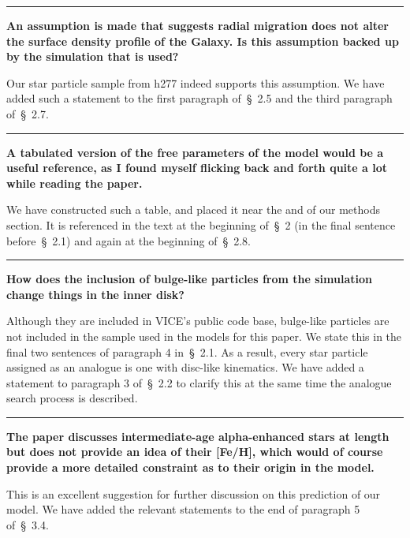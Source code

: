 \documentclass{report}
\newcommand{\breakline}{\noindent\rule{\textwidth}{1pt}}
\begin{document}
\par\null\par 
\breakline 
\par\null\par 
\textbf{
	An assumption is made that suggests radial migration does not alter the 
	surface density profile of the Galaxy. 
	Is this assumption backed up by the simulation that is used? 
} 
\par 
Our star particle sample from h277 indeed supports this assumption. 
We have added such a statement to the first paragraph of~\S~2.5 and the third 
paragraph of~\S~2.7. 

\par\null\par 
\breakline 
\par\null\par 
\textbf{
	A tabulated version of the free parameters of the model would be a useful 
	reference, as I found myself flicking back and forth quite a lot while 
	reading the paper. 
} 
\par 
We have constructed such a table, and placed it near the and of our methods 
section. 
It is referenced in the text at the beginning of~\S~2 (in the final sentence 
before~\S~2.1) and again at the beginning of~\S~2.8. 

\par\null\par 
\breakline 
\par\null\par 
\textbf{
	How does the inclusion of bulge-like particles from the simulation change 
	things in the inner disk? 
} 
\par 
Although they are included in VICE's public code base, bulge-like particles are 
not included in the sample used in the models for this paper. 
We state this in the final two sentences of paragraph 4 in~\S~2.1. 
As a result, every star particle assigned as an analogue is one with disc-like 
kinematics. 
We have added a statement to paragraph 3 of~\S~2.2 to clarify this at the same 
time the analogue search process is described. 

\par\null\par 
\breakline 
\par\null\par 
\textbf{ 
	The paper discusses intermediate-age alpha-enhanced stars at length but 
	does not provide an idea of their [Fe/H], which would of course provide a 
	more detailed constraint as to their origin in the model. 
} 
\par 
This is an excellent suggestion for further discussion on this prediction of 
our model. 
We have added the relevant statements to the end of paragraph 5 of~\S~3.4. 
\end{document}
